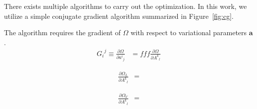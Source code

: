 \documentclass[aps,prl,reprint,amsmath,amssymb]{revtex4-1}
\begin{document}
There exists multiple algorithms to carry out the optimization. In this work, we utilize a simple conjugate gradient algorithm summarized in Figure~\ref{fig:cg}. 

The algorithm requires the gradient of $\Omega$ with respect to variational parameters $\mathbf{a}$.
%
\begin{equation} \label{eq:grad}
\begin{split}
{G_i}^j \equiv \frac{\partial \Omega}{\partial {a^i}_j} &= fff \frac{\partial \Omega}{\partial {A^k}_l}
\end{split}
\end{equation}
%

%
\begin{equation} \label{eq:grad}
\begin{split}
\frac{\partial \Omega_L}{\partial {A^k}_l} &= 
\end{split}
\end{equation}
%

%
\begin{equation} \label{eq:grad}
\begin{split}
\frac{\partial \Omega_V}{\partial {A^k}_l} &= 
\end{split}
\end{equation}
%
\end{document}
